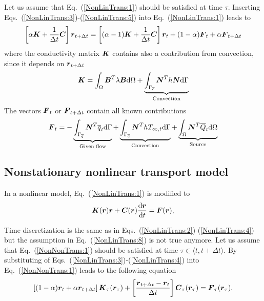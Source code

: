 \documentclass[a4paper]{article}
\newcommand{\mbf}[1]{\mbox{\boldmath$#1$}}
\newcommand{\del}[2]{\mbox{$\displaystyle\frac{#1}{#2}$}}
\newcommand{\ud}{\mathrm{d}}
\newcommand{\refeq}[1]{Eq.~(\ref{#1})}
\newcommand{\refeqsr}[2]{\mbox{Eqs.~(\ref{#1})-(\ref{#2})}}
\begin{document}
Let us assume that \refeq{NonLinTrans:1} should be satisfied at time $\tau$. Inserting \refeqsr{NonLinTrans:3}{NonLinTrans:5}
into \refeq{NonLinTrans:1} leads to
\begin{eqnarray}
\left[\alpha \mbf{K} + \frac{1}{\Delta t} \mbf{C} \right] \mbf{r}_{t+\Delta t} = 
\left[(\alpha-1) \mbf{K} + \frac{1}{\Delta t} \mbf{C} \right] \mbf{r}_{t} +
(1-\alpha) \mbf{F}_{t} + \alpha \mbf{F}_{t+\Delta t}\label{NonLinTrans:6}
\end{eqnarray}
where the conductivity matrix $\mbf{K}$ contains also a contribution from convection, since it depends on
$\mbf{r}_{t+\Delta t}$
\begin{eqnarray}
\mbf{K} = \int_{\Omega}\mbf{B}^T \lambda \mbf{B} \ud\Omega + \underbrace{\int_{{\Gamma}_{\overline{c}}} \mbf{N}^T h \mbf{N} \ud \Gamma}_{\textrm{Convection}}\label{NonLinTrans:7}
\end{eqnarray}
The vectors $\mbf{F}_t$ or $\mbf{F}_{t+\Delta t}$ contain all known contributions
\begin{eqnarray}
\mbf{F}_t = - \underbrace{\int_{\Gamma_{\overline{q}}} \mbf{N}^T \overline{q}_t \ud \Gamma}_{\textrm{Given flow}} +
\underbrace{\int_{\Gamma_{\overline{c}}} \mbf{N}^T h T_{\infty,t} \ud \Gamma}_{\textrm{Convection}} +
\underbrace{\int_{\Omega}\mbf{N}^T\overline{Q}_t\ud\Omega}_{\textrm{Source}}\label{NonLinTrans:8}
\end{eqnarray}

\subsection{Nonstationary nonlinear transport model}
\label{NonNonTrans}
In a nonlinear model, \refeq{NonLinTrans:1} is modified to
\begin{eqnarray}
\mbf{K}(\mbf{r}) \mbf{r} + \mbf{C}(\mbf{r})\frac{{\rm d}\mbf{r}}{{\rm d} t} = \mbf{F}(\mbf{r})\label{NonNonTrans:1},
\end{eqnarray}

Time discretization is the same as in \refeqsr{NonLinTrans:2}{NonLinTrans:4} but the assumption in \refeq{NonLinTrans:8} is not true anymore. Let us assume that \refeq{NonNonTrans:1} should be satisfied at time $\tau\in\langle t,t+\Delta t \rangle$. By substituting of \refeqsr{NonLinTrans:3}{NonLinTrans:4} into \refeq{NonNonTrans:1} leads to the following equation
\begin{equation}
\left[(1-\alpha)\mbf{r}_t + \alpha\mbf{r}_{t+\Delta t} \right] \mbf{K}_{\tau}(\mbf{r}_\tau) +
\left[\del{\mbf{r}_{t+\Delta t}-\mbf{r}_t}{\Delta t}\right] \mbf{C}_{\tau}(\mbf{r}_\tau) = 
\mbf{F}_{\tau}(\mbf{r}_\tau).\label{NonNonTrans:5}
\end{equation}
\end{document}
